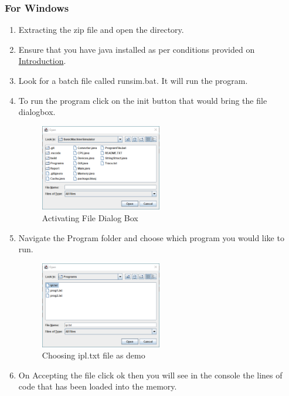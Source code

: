 \documentclass[10pt]{article}
\begin{document}
\subsubsection{For Windows}\label{steps_for_windows}
\begin{enumerate}
  \item Extracting the zip file and open the directory.
  \item Ensure that you have java installed as per conditions provided on \hyperref[windowsetup]{Introduction}.
  \item Look for a batch file called runsim.bat. It will run the program.
  \item To run the program click on the init button that would bring the file dialogbox.
  \begin{figure}[H]
    \centering
    \includegraphics[width=0.5\textwidth]{Pics/Fig4.png}
    \caption{Activating File Dialog Box}
    \label{fig:fileDialog}
  \end{figure}
  \item Navigate the Program folder and choose which program you would like to run.
  \begin{figure}[H]
    \centering
    \includegraphics[width=0.5\textwidth]{Pics/Fig5.png}
    \caption{Choosing ipl.txt file as demo}
    \label{fig:Choosing File}
  \end{figure}
  \item On Accepting the file click ok then you will see in the console the lines of code that has been loaded into
  the memory.
  \begin{figure}[H]

\end{figure}
\end{enumerate}
\end{document}
